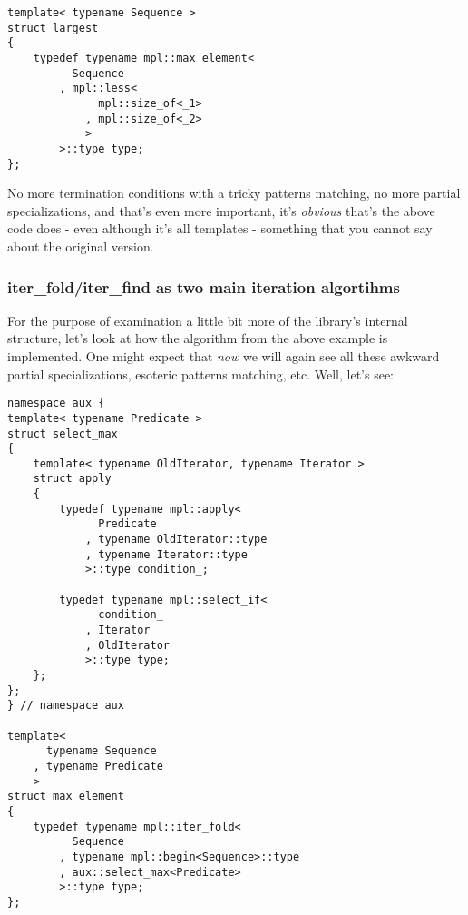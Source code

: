 \documentclass{netobjectdays}
\begin{document}
{\footnotesize
\begin{verbatim}
template< typename Sequence >
struct largest
{
    typedef typename mpl::max_element<
          Sequence
        , mpl::less<
              mpl::size_of<_1>
            , mpl::size_of<_2>
            >
        >::type type;
};
\end{verbatim}
}

No more termination conditions with a tricky patterns matching, 
no more partial specializations, and that's even more important, 
it's \emph{obvious} that's the above code does - even although 
it's all templates - something that you cannot say about the 
original version.

\subsubsection{iter\_fold/iter\_find as two main iteration 
algortihms}

For the purpose of examination a little bit more of the 
library's internal structure, let's look at how the 
 algorithm from the above example is 
implemented. One might expect that \emph{now} we will again 
see all these awkward partial specializations, esoteric 
patterns matching, etc. Well, let's see:

{\footnotesize
\begin{verbatim}
namespace aux {
template< typename Predicate >
struct select_max
{
    template< typename OldIterator, typename Iterator >
    struct apply
    {
        typedef typename mpl::apply<
              Predicate
            , typename OldIterator::type
            , typename Iterator::type
            >::type condition_;

        typedef typename mpl::select_if<
              condition_
            , Iterator
            , OldIterator
            >::type type;
    };
};
} // namespace aux 

template<
      typename Sequence
    , typename Predicate
    >
struct max_element
{
    typedef typename mpl::iter_fold<    
          Sequence
        , typename mpl::begin<Sequence>::type
        , aux::select_max<Predicate>
        >::type type;
};
\end{verbatim}
}
\end{document}
